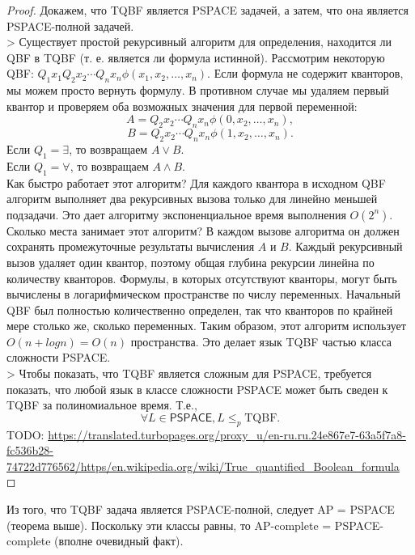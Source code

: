     \begin{proof}
        Докажем, что TQBF является PSPACE задачей, а затем, что она является PSPACE-полной задачей.\\
        > Существует простой рекурсивный алгоритм для определения, находится ли QBF в TQBF (т. е. является ли формула истинной). Рассмотрим некоторую QBF:
        $Q_{1}x_{1}Q_{2}x_{2}\cdots Q_{n}x_{n}\phi (x_{1},x_{2},\dots ,x_{n}).$
        Если формула не содержит кванторов, мы можем просто вернуть формулу. В противном случае мы удаляем первый квантор и проверяем оба возможных значения для первой переменной:
        $$A=Q_{2}x_{2}\cdots Q_{n}x_{n}\phi (0,x_{2},\dots ,x_{n}),$$
        $$B=Q_{2}x_{2}\cdots Q_{n}x_{n}\phi (1,x_{2},\dots ,x_{n}).$$
        Если $Q_{1}=\exists$, то возвращаем $A\lor B$.\\
        Если $Q_{1}=\forall$, то возвращаем $A\land B$.\\
        Как быстро работает этот алгоритм? Для каждого квантора в исходном QBF алгоритм выполняет два рекурсивных вызова только для линейно меньшей подзадачи. Это дает алгоритму экспоненциальное время выполнения $O(2^n)$.\\
        Сколько места занимает этот алгоритм? В каждом вызове алгоритма он должен сохранять промежуточные результаты вычисления $A$ и $B$. Каждый рекурсивный вызов удаляет один квантор, поэтому общая глубина рекурсии линейна по количеству кванторов. Формулы, в которых отсутствуют кванторы, могут быть вычислены в логарифмическом пространстве по числу переменных. Начальный QBF был полностью количественно определен, так что кванторов по крайней мере столько же, сколько переменных. Таким образом, этот алгоритм использует $O(n + log n) = O(n)$ пространства. Это делает язык TQBF частью класса сложности PSPACE.\\
        > Чтобы показать, что TQBF является сложным для PSPACE, требуется показать, что любой язык в классе сложности PSPACE может быть сведен к TQBF за полиномиальное время. Т.е.,
        $$\forall L\in {\mathsf{PSPACE}},L\leq _{p}\mathrm{TQBF} .$$
        TODO: \url{https://translated.turbopages.org/proxy_u/en-ru.ru.24e867e7-63a5f7a8-fc536b28-74722d776562/https/en.wikipedia.org/wiki/True_quantified_Boolean_formula}
    \end{proof}
    \begin{Rem}
        Из того, что TQBF задача является PSPACE-полной, следует AP = PSPACE (теорема выше). Поскольку эти классы равны, то AP-complete = PSPACE-complete (вполне очевидный факт).
    \end{Rem}

